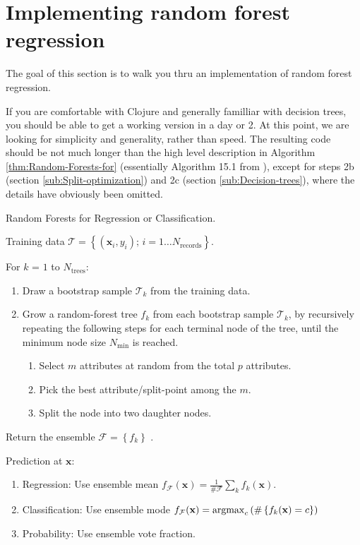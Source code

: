 \documentclass[10pt,openany]{article}
\numberwithin{definition}{section}
\numberwithin{example}{section}
\numberwithin{equation}{section}
\numberwithin{figure}{section}
\begin{document}
\newpage{}

\section{\label{sec:Implementing-random-forest}Implementing random forest
regression}

The goal of this section is to walk you thru an implementation of
random forest regression.

If you are comfortable with Clojure and generally familliar with decision
trees, you should be able to get a working version in a day or 2.
At this point, we are looking for simplicity and generality, rather
than speed. The resulting code should be not much longer than the
high level description in Algorithm \ref{thm:Random-Forests-for}
(essentially Algorithm 15.1 from \cite{hastie-tibshirani-friedman-2009}),
except for steps 2b (section \ref{sub:Split-optimization}) and 2c
(section \ref{sub:Decision-trees}), where the details have obviously
been omitted.
\begin{algorithm}
\label{thm:Random-Forests-for}Random Forests for Regression or Classification. 

Training data $\mathcal{T}=\left\{ (\mathbf{x}_{i},y_{i});\,i=1\ldots N_{\textrm{records}}\right\} $.

For $k$ = $1$ to $N_{\textrm{trees}}$: 
\begin{enumerate}
\item Draw a bootstrap sample $\mathcal{T}_{k}$ from the training data. 
\item Grow a random-forest tree $f_{k}$ from each bootstrap sample $\mathcal{T}_{k}$,
by recursively repeating the following steps for each terminal node
of the tree, until the minimum node size $N_{\min}$ is reached. 

\begin{enumerate}
\item Select $m$ attributes at random from the total $p$ attributes. 
\item Pick the best attribute/split-point among the $m$.
\item Split the node into two daughter nodes. 
\end{enumerate}
\end{enumerate}
Return the ensemble $\mathcal{F}=\left\{ f_{k}\right\} $ . 

Prediction at $\mathbf{x}$: 
\begin{enumerate}
\item Regression: Use ensemble mean 
$f_{\mathcal{F}}(\mathbf{x})=\frac{1}{\#\mathcal{F}}\sum_{k}f_{k}(\mathbf{x})$. 
\item Classification: Use ensemble mode 
$f_{\mathcal{F}}(\mathbf{x})=\operatorname*{argmax}_{c}\left(\#\left\{ f_{k}(\mathbf{x})=c\right\} \right)$
\item Probability: Use ensemble vote fraction.
\end{enumerate}
\end{algorithm}
\end{document}
